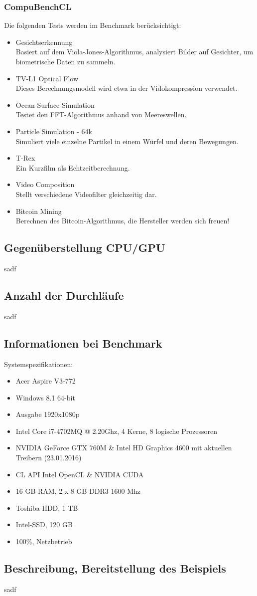 \documentclass[letterpaper, 12pt]{article}
\let\tempsubsection\subsection
\renewcommand\subsection[1]{\vspace{0cm}\tempsubsection{#1}\vspace{0cm}}
\let\tempsubsubsection\subsubsection
\renewcommand\subsubsection[1]{\vspace{0cm}\tempsubsubsection{#1}\vspace{0cm}}
\begin{document}
\subsubsection{CompuBenchCL}
Die folgenden Tests werden im Benchmark berücksichtigt:
\begin{itemize}
	\item Gesichtserkennung \\
	Basiert auf dem Viola-Jones-Algorithmus, analysiert Bilder auf Gesichter, um biometrische Daten zu sammeln.
	\item  TV-L1 Optical Flow \\
	Dieses Berechnungsmodell wird etwa in der Vidokompression verwendet.
	\item Ocean Surface Simulation \\
	Testet den FFT-Algorithmus anhand von Meereswellen.
	\item Particle Simulation - 64k \\
	Simuliert viele einzelne Partikel in einem Würfel und deren Bewegungen.
	\item T-Rex \\
	Ein Kurzfilm als Echtzeitberechnung.
	\item Video Composition \\
	Stellt verschiedene Videofilter gleichzeitig dar.
	\item Bitcoin Mining \\
	Berechnen des Bitcoin-Algorithmus, die Hersteller werden sich freuen!
\end{itemize}

\newpage

\subsection{Gegenüberstellung CPU/GPU}
sadf
\subsection{Anzahl der Durchläufe}
sadf
\subsection{Informationen bei Benchmark}
Systemspezifikationen:
\begin{itemize}
	\item Acer Aspire V3-772
	\item Windows 8.1 64-bit
	\item Ausgabe 1920x1080p
	\item Intel Core i7-4702MQ @ 2.20Ghz, 4 Kerne, 8 logische Prozessoren
	\item NVIDIA GeForce GTX 760M \& Intel HD Graphics 4600 mit aktuellen Treibern (23.01.2016)
	\item CL API Intel OpenCL \& NVIDIA CUDA
	\item 16 GB RAM, 2 x 8 GB DDR3 1600 Mhz
	\item Toshiba-HDD, 1 TB
	\item Intel-SSD, 120 GB
	\item 100\%, Netzbetrieb
\end{itemize}
\subsection{Beschreibung, Bereitstellung des Beispiels}
sadf

\newpage



\lstlistoflistings
\listoffigures
\end{document}
